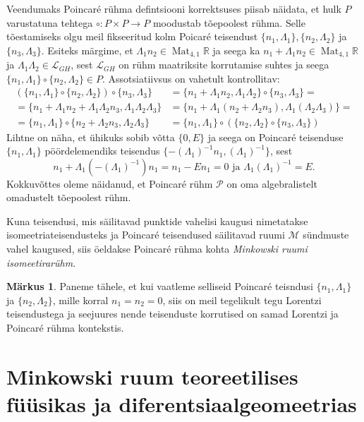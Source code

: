 \documentclass[12pt]{article}
\theoremstyle{plain}
\theoremstyle{definition}
\newtheorem{markus}{Märkus}[section]
\numberwithin{equation}{section}
\def\R{{\mathbb R}}
\def\L{{\mathcal L}}
\def\M{{\mathcal M}}
\def\P{{\mathcal P}}
\DeclareMathOperator{\Mat}{Mat}
\begin{document}
Veendumaks Poincar\'e rühma defintsiooni korrektsuses piisab 
näidata, et hulk $P$ varustatuna tehtega 
$\circ : P \times P \rightarrow P$ moodustab tõepoolest rühma.
Selle tõestamiseks olgu meil fikseeritud kolm Poicar\'e teisendust 
$\{n_1, \Lambda_1\}, \{n_2, \Lambda_2\}$ ja $\{n_3, \Lambda_3\}$. 
Esiteks märgime, et $ \Lambda_1 n_2 \in \Mat_{4, 1}\R$ ja seega ka 
$n_1 + \Lambda_1 n_2 \in \Mat_{4, 1}\R$ ja $\Lambda_1 \Lambda_2 \in 
\L_{GH}$, sest $\L_{GH}$ on rühm maatriksite korrutamise suhtes ja 
seega $\{n_1, \Lambda_1\} \circ \{n_2, \Lambda_2\} \in P$.
Assotsiatiivsus on vahetult kontrollitav:
\begin{align*}
\left(\{n_1, \Lambda_1\} \circ \{n_2, \Lambda_2\}\right) \circ 
\{n_3, \Lambda_3\} &= \{n_1 + \Lambda_1 n_2, \Lambda_1 \Lambda_2 \} 
\circ \{n_3, \Lambda_3 \} = \\
= \{n_1 + \Lambda_1 n_2 + \Lambda_1 \Lambda_2 n_3, \Lambda_1 
\Lambda_2 \Lambda_3 \} &= \{n_1 + \Lambda_1 \left( n_2 + 
\Lambda_2 n_3 \right), \Lambda_1 \left( \Lambda_2 
\Lambda_3 \right)\} = \\
= \{n_1, \Lambda_1 \} \circ \{n_2 + \Lambda_2 n_3, \Lambda_2 
\Lambda_3 \} &= \{n_1, \Lambda_1\} \circ \left( \{n_2, \Lambda_2\} 
\circ \{n_3, \Lambda_3\} \right)
\end{align*}
Lihtne on näha, et ühikuks sobib võtta $\{0, E\}$ ja seega on 
Poincar\'e teisenduse $\{n_1, \Lambda_1\}$ pöördelemendiks 
teisendus $\{ -\left(\Lambda_1\right)^{-1} n_1, 
\left(\Lambda_1\right)^{-1} \}$, sest
\[ n_1 + \Lambda_1 \left(-\left(\Lambda_1\right)^{-1}\right) n_1 = 
n_1 - E n_1 = 0 \text{ ja } 
\Lambda_1 \left(\Lambda_1\right)^{-1} = E. \]
Kokkuvõttes oleme näidanud, et Poincar\'e rühm $\P$ on oma 
algebralistelt omadustelt tõepoolest rühm.

Kuna teisendusi, mis säilitavad punktide vahelisi kaugusi 
nimetatakse isomeetriateisendusteks ja Poincar\'e teisendused 
säilitavad ruumi $\M$ sündmuste vahel kaugused, siis öeldakse 
Poincar\'e rühma kohta \emph{Minkowski ruumi isomeetirarühm}.

\begin{markus}
Paneme tähele, et kui vaatleme selliseid Poincar\'e teisndusi 
$\{n_1, \Lambda_1\}$ ja $\{n_2, \Lambda_2\}$, mille korral $n_1 = 
n_2 = 0$, siis on meil tegelikult tegu Lorentzi teisendustega ja 
seejuures nende teisenduste korrutised on samad Lorentzi ja 
Poincar\'e rühma kontekstis.
\end{markus}

\newpage
\section{Minkowski ruum teoreetilises füüsikas ja diferentsiaalgeomeetrias}
\end{document}
